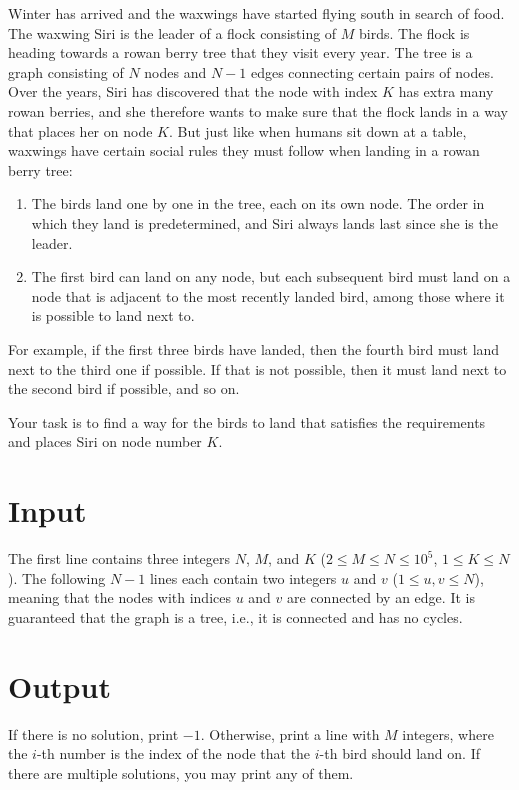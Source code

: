 Winter has arrived and the waxwings have started flying south in search of food. The waxwing Siri is the leader of a
flock consisting of $M$ birds. The flock is heading towards a rowan berry tree that they visit every year. The tree is a graph consisting of $N$ nodes
and $N-1$ edges connecting certain pairs of nodes. Over the years, Siri has discovered that the node with index $K$ has extra
many rowan berries, and she therefore wants to make sure that the flock lands in a way that places her on node $K$.
But just like when humans sit down at a table, waxwings have certain social rules they must follow when
landing in a rowan berry tree:

\begin{enumerate}
\item The birds land one by one in the tree, each on its own node. The order in which they land is predetermined, and Siri always lands
last since she is the leader.
\item The first bird can land on any node, but each subsequent bird must land on a node that
is adjacent to the most recently landed bird, among those where it is possible to land next to.
\end{enumerate}

For example, if the first three birds have landed, then the fourth bird must land next to the third one if possible. If that
is not possible, then it must land next to the second bird if possible, and so on.

Your task is to find a way for the birds to land that satisfies the requirements and places Siri on node number $K$.

\section*{Input}
The first line contains three integers $N$, $M$, and $K$ ($2 \leq M \leq N \leq 10^5$, $1 \leq K \leq N$).
The following $N-1$ lines each contain two integers $u$ and $v$ ($1 \leq u,v \leq N$), meaning that the nodes with
indices $u$ and $v$ are connected by an edge.
It is guaranteed that the graph is a tree, i.e., it is connected and has no cycles.

\section*{Output}
If there is no solution, print $-1$. Otherwise, print a line with $M$ integers, where the $i$-th number
is the index of the node that the $i$-th bird should land on. If there are multiple solutions, you may print any of
them.

